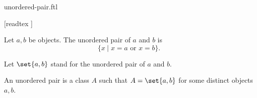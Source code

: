\documentclass{stex}
\begin{document}
\begin{smodule}{unordered-pair.ftl}

  \begin{forthel}

    [readtex ]
  \end{forthel}

  \begin{forthel}
    \begin{definition}
      Let $a, b$ be objects.
      The unordered pair of $a$ and $b$ is \[ \{ x \mid \text{$x = a$ or $x = b$} \}. \]
    \end{definition}

    Let $\set{a, b}$ stand for the unordered pair of $a$ and $b$.
  \end{forthel}

  \begin{forthel}
    \begin{definition}
      An unordered pair is a class $A$ such that $A = \set{a, b}$ for some distinct objects $a, b$.
    \end{definition}
  \end{forthel}
\end{smodule}
\end{document}
